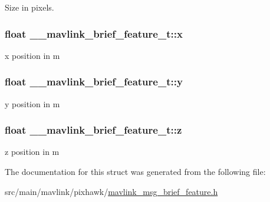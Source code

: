 Size in pixels. 

\hypertarget{struct____mavlink__brief__feature__t_a3578814e1aaef42453c7be4812440040}{
\subsubsection[{x}]{\setlength{\rightskip}{0pt plus 5cm}float \+\_\+\+\_\+mavlink\+\_\+brief\+\_\+feature\+\_\+t\+::x}}\label{struct____mavlink__brief__feature__t_a3578814e1aaef42453c7be4812440040}


x position in m 

\hypertarget{struct____mavlink__brief__feature__t_a1c888f447b41c0762bd985689228c060}{
\subsubsection[{y}]{\setlength{\rightskip}{0pt plus 5cm}float \+\_\+\+\_\+mavlink\+\_\+brief\+\_\+feature\+\_\+t\+::y}}\label{struct____mavlink__brief__feature__t_a1c888f447b41c0762bd985689228c060}


y position in m 

\hypertarget{struct____mavlink__brief__feature__t_ab1c13951fa98c28e8abacf90c2be0af5}{
\subsubsection[{z}]{\setlength{\rightskip}{0pt plus 5cm}float \+\_\+\+\_\+mavlink\+\_\+brief\+\_\+feature\+\_\+t\+::z}}\label{struct____mavlink__brief__feature__t_ab1c13951fa98c28e8abacf90c2be0af5}


z position in m 



The documentation for this struct was generated from the following file\+:\begin{DoxyCompactItemize}
\item 
src/main/mavlink/pixhawk/\hyperlink{mavlink__msg__brief__feature_8h}{mavlink\+\_\+msg\+\_\+brief\+\_\+feature.\+h}\end{DoxyCompactItemize}
